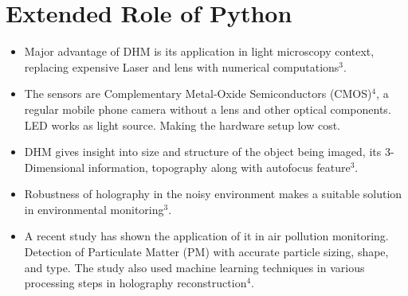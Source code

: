 \documentclass[a0paper,fleqn]{betterposter}
\begin{document}
{%

%
%
%

}{

\section{Extended Role of Python}

\begin{itemize}
\item Major advantage of DHM is its application in light microscopy context, replacing expensive Laser and lens with numerical computations$^{\text{3}}$. 

\item The sensors are Complementary Metal-Oxide Semiconductors (CMOS)$^{\text{4}}$, a regular mobile phone camera without a lens and other optical components. LED works as light source. Making the hardware setup low cost. 

\item DHM gives insight into size and structure of the object being imaged, its 3-Dimensional information, topography along with autofocus feature$^{\text{3}}$. 

\item Robustness of holography in the noisy environment makes a suitable solution in environmental monitoring$^{\text{3}}$.

\item A recent study has shown the application of it in air pollution monitoring. Detection of Particulate Matter (PM) with accurate particle sizing, shape, and type. The study also used machine learning techniques in various processing steps in holography reconstruction$^{\text{4}}$.   


\end{itemize}}
\end{document}
